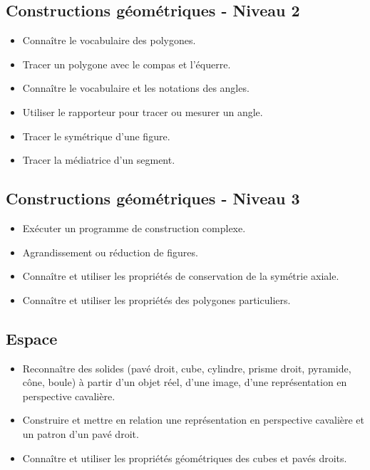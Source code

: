 \documentclass[a4paper,12pt,fleqn]{article}
\begin{document}
\subsection*{Constructions géométriques - Niveau 2}

\begin{itemize}[itemsep=1em]
	\item {}Connaître le vocabulaire des polygones.
	\item {}Tracer un polygone avec le compas et l’équerre.
	\item {}Connaître le vocabulaire et les notations des angles.
	\item {}Utiliser le rapporteur pour tracer ou mesurer un angle.
	\item {}Tracer le symétrique d’une figure.
	\item {}Tracer la médiatrice d’un segment.
\end{itemize}

\subsection*{Constructions géométriques - Niveau 3}

\begin{itemize}[itemsep=1em]
	\item {}Exécuter un programme de construction complexe.
	\item {}Agrandissement ou réduction de figures.
	\item {}Connaître et utiliser les propriétés de conservation de la symétrie axiale.
	\item {}Connaître et utiliser les propriétés des polygones particuliers.
\end{itemize}

\subsection*{Espace}

\begin{itemize}[itemsep=1em]
	\item {}Reconnaître des solides (pavé droit, cube, cylindre, prisme droit, pyramide, cône, boule) à partir d’un objet réel, d’une image, d’une représentation en perspective cavalière.
	\item {}Construire et mettre en relation une représentation en perspective cavalière et un patron d’un pavé droit.
    \item {}Connaître et utiliser les propriétés géométriques des cubes et pavés droits.
\end{itemize}
\end{document}
